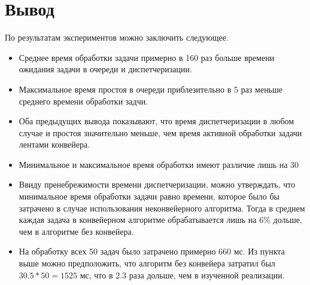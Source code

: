 \section*{Вывод}
По результатам экспериментов можно заключить следующее.
\begin{itemize}
	\item Среднее время обработки задачи примерно в 160 раз больше времени ожидания задачи в очереди и диспетчеризации.
	\item Максимальное время простоя в очереди приблезительно в 5 раз меньше среднего времени обработки задчи. 
	\item Оба предыдущих вывода показывают, что время диспетчеризации в любом случае и простоя значительно меньше, чем время активной обработки задачи лентами конвейера.
	\item Минимальное и максимальное время обработки имеют различие лишь на 30%
	\item Ввиду пренебрежимости времени диспетчеризации, можно утверждать, что минимальное время обработки задачи равно времени, которое было бы затрачено в случае использования неконвейерного алгоритма. Тогда в среднем каждая задача в конвейерном алгоритме обрабатывается лишь на $6\%$ дольше, чем в алгоритме без конвейера.
	\item На обработку всех 50 задач было затрачено примерно 660 мс. Из пункта выше можно предположить, что алгоритм без конвейера затратил был $30.5*50 = 1525$ мс, что в 2.3 раза дольше, чем в изученной реализации.
\end{itemize}


	